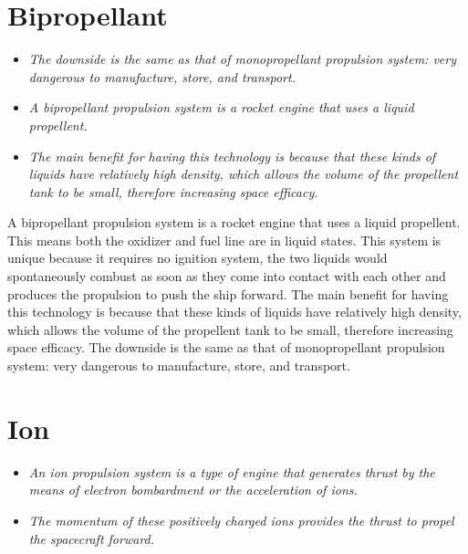 \section{Bipropellant}\label{bipropellant}

\begin{itemize}
\item
  \emph{The downside is the same as that of monopropellant propulsion
  system: very dangerous to manufacture, store, and transport.}
\item
  \emph{A bipropellant propulsion system is a rocket engine that uses a
  liquid propellent.}
\item
  \emph{The main benefit for having this technology is because that
  these kinds of liquids have relatively high density, which allows the
  volume of the propellent tank to be small, therefore increasing space
  efficacy.}
\end{itemize}

A bipropellant propulsion system is a rocket engine that uses a liquid
propellent. This means both the oxidizer and fuel line are in liquid
states. This system is unique because it requires no ignition system,
the two liquids would spontaneously combust as soon as they come into
contact with each other and produces the propulsion to push the ship
forward. The main benefit for having this technology is because that
these kinds of liquids have relatively high density, which allows the
volume of the propellent tank to be small, therefore increasing space
efficacy. The downside is the same as that of monopropellant propulsion
system: very dangerous to manufacture, store, and transport.

\section{Ion}\label{ion}

\begin{itemize}
\item
  \emph{An ion propulsion system is a type of engine that generates
  thrust by the means of electron bombardment or the acceleration of
  ions.}
\item
  \emph{The momentum of these positively charged ions provides the
  thrust to propel the spacecraft forward.}
\end{itemize}

